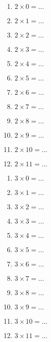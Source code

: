 \documentclass[11pt]{article}
\begin{document}
\begin{multicols}{2}
\begin{exercice}[1]
\begin{multicols}{2}
\begin{enumerate}[label=]
\item $2 \times 0 = \ldots$
\item $2 \times 1 = \ldots$
\item $2 \times 2 = \ldots$
\item $2 \times 3 = \ldots$
\item $2 \times 4 = \ldots$
\item $2 \times 5 = \ldots$
\item $2 \times 6 = \ldots$
\item $2 \times 7 = \ldots$
\item $2 \times 8 = \ldots$
\item $2 \times 9 = \ldots$
\item $2 \times 10 = \ldots$
\item $2 \times 11 = \ldots$
\end{enumerate}

\columnbreak

\end{multicols}
\end{exercice}

\begin{exercice}[1]
\begin{multicols}{2}
\begin{enumerate}[label=]
\item $3 \times 0 = \ldots$
\item $3 \times 1 = \ldots$
\item $3 \times 2 = \ldots$
\item $3 \times 3 = \ldots$
\item $3 \times 4 = \ldots$
\item $3 \times 5 = \ldots$
\item $3 \times 6 = \ldots$
\item $3 \times 7 = \ldots$
\item $3 \times 8 = \ldots$
\item $3 \times 9 = \ldots$
\item $3 \times 10 = \ldots$
\item $3 \times 11 = \ldots$
\end{enumerate}

\columnbreak

\end{multicols}
\end{exercice}
\end{multicols}
\end{document}
